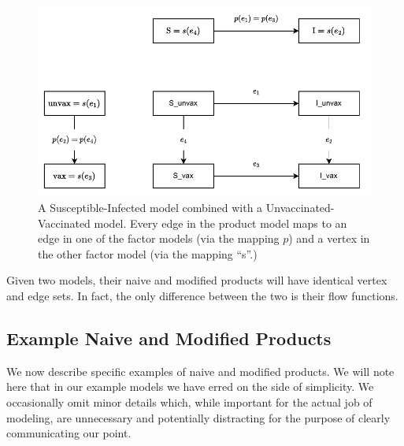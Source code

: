 \documentclass{article}
\theoremstyle{definition}
\begin{document}
\begin{figure}
    \centering
    \includegraphics[width=\textwidth]{images_pdf/product_math.pdf}
    \caption{A Susceptible-Infected model combined with a Unvaccinated-Vaccinated model. Every edge in the product model maps to an edge in one of the factor models (via the mapping $p$) and a vertex in the other factor model (via the mapping ``s''.)
    }
    \label{fig:spexplanation}
\end{figure}

\FloatBarrier

Given two models, their naive and modified products will have identical vertex and edge sets. In fact, the only difference between the two is their flow functions. 

\subsection{Example Naive and Modified Products}

We now describe specific examples of naive and modified products. We will note here that in our example models we have erred on the side of simplicity. We occasionally omit minor details which, while important for the actual job of modeling, are unnecessary and potentially distracting for the purpose of clearly communicating our point.  
\end{document}
